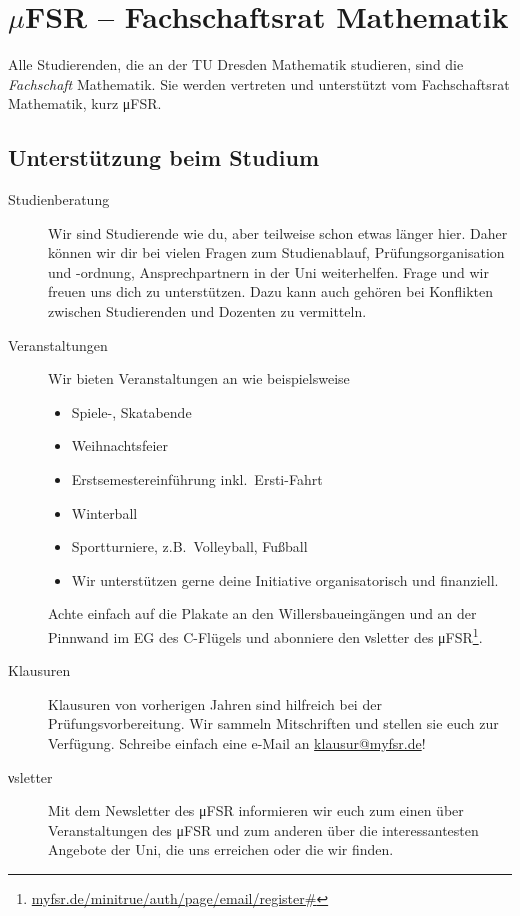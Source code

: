 \documentclass{scrartcl}
\begin{document}
\newcommand{\keyword}{\emph}
\section{\texorpdfstring{$\mu$}{my}FSR -- Fachschaftsrat Mathematik}
Alle Studierenden, die an der TU Dresden Mathematik studieren, sind die \keyword{Fachschaft} Mathematik.
Sie werden vertreten und unterstützt vom Fachschaftsrat Mathematik, kurz μFSR.

\subsection{Unterstützung beim Studium}
\label{sub:unterstutzung_beim_studium}
\begin{description}
  \item[Studienberatung] Wir sind Studierende wie du, aber teilweise schon etwas länger hier.
    Daher können wir dir bei vielen Fragen zum Studienablauf, Prüfungsorganisation und -ordnung, Ansprechpartnern in der Uni weiterhelfen.
    Frage und wir freuen uns dich zu unterstützen.
    Dazu kann auch gehören bei Konflikten zwischen Studierenden und Dozenten zu vermitteln.
  \item[Veranstaltungen] Wir bieten Veranstaltungen an wie beispielsweise
    \begin{itemize}
      \item Spiele-, Skatabende
      \item Weihnachtsfeier
      \item Erstsemestereinführung inkl.\ Ersti-Fahrt
      \item Winterball
      \item Sportturniere, z.B.\ Volleyball, Fußball
      \item Wir unterstützen gerne deine Initiative organisatorisch und finanziell.
    \end{itemize}
    Achte einfach auf die Plakate an den Willersbaueingängen und an der Pinnwand im EG des C-Flügels und
    abonniere den νsletter des μFSR\footnote{\url{myfsr.de/minitrue/auth/page/email/register\#}}.
  \item[Klausuren] Klausuren von vorherigen Jahren sind hilfreich bei der Prüfungsvorbereitung.
    Wir sammeln Mitschriften und stellen sie euch zur Verfügung.
    Schreibe einfach eine e-Mail an \url{klausur@myfsr.de}!
  \item[νsletter] Mit dem Newsletter des μFSR informieren wir euch zum einen über
    Veranstaltungen des μFSR und zum anderen über die interessantesten Angebote der Uni,
    die uns erreichen oder die wir finden.
\end{description}
\end{document}
